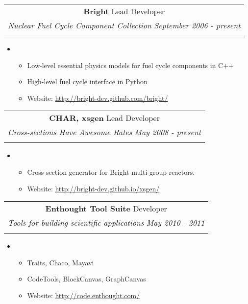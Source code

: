 \documentclass[letterpaper,11pt]{article}
\makeatletter
\newcommand{\resitem}[1]{\item #1 \vspace{-2pt}}
\newcommand{\ressubheadingitems}[5]{
    \begin{center}
    \begin{tabular*}{6.5in}{l@{\extracolsep{\fill}}r}
        \multicolumn{2}{c}{\textbf{#1} \cftdotfill{\cftdotsep} #2} \\
        \multicolumn{2}{c}{\textit{#3} \cftdotfill{\cftdotsep} \textit{#4}} \\
        \vphantom{E}
    \end{tabular*}
    \end{center}
    \vspace{-32pt}
    \begin{itemize}\renewcommand{\labelitemi}{}
        \item\begin{itemize}
        #5
        \end{itemize}
    \end{itemize}
}
\makeatother
\begin{document}
\ressubheadingitems{Bright}{Lead Developer}{Nuclear Fuel Cycle Component Collection}
    {September 2006 - present} {
    \resitem{Low-level essential physics models for fuel cycle components in C++}
    \resitem{High-level fuel cycle interface in Python}
    \resitem{Website: \url{http://bright-dev.github.com/bright/}}
    }

\ressubheadingitems{CHAR, xsgen}{Lead Developer}{Cross-sections Have Awesome Rates}
    {May 2008 - present} {
    \resitem{Cross section generator for Bright multi-group reactors.}
    \resitem{Website: \url{http://bright-dev.github.io/xsgen/}}
    }

\ressubheadingitems{Enthought Tool Suite}{Developer}
    {Tools for building scientific applications}{May 2010 - 2011} {
    \resitem{Traits, Chaco, Mayavi}
    \resitem{CodeTools, BlockCanvas, GraphCanvas}
    \resitem{Website: \url{http://code.enthought.com/}}
    }
\end{document}
